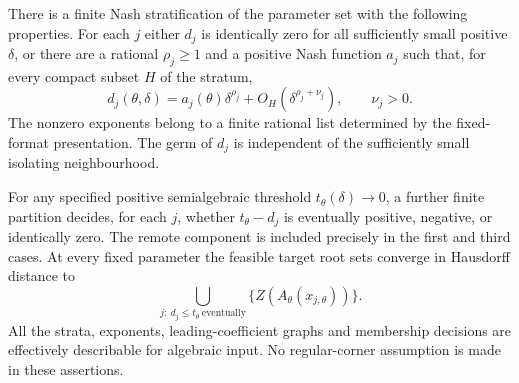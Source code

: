 \begin{theorem}\label{thm:singular-entrances}
There is a finite Nash stratification of the parameter set with the
following properties. For each $j$ either $d_j$ is identically zero for
all sufficiently small positive $\delta$, or there are a rational
$\rho_j\ge1$ and a positive Nash function $a_j$ such that, for every
compact subset $H$ of the stratum,
\begin{equation}\label{eq:singular-power}
 d_j(\theta,\delta)=a_j(\theta)\delta^{\rho_j}
            +O_H(\delta^{\rho_j+\nu_j}),\qquad \nu_j>0.
\end{equation}
The nonzero exponents belong to a finite rational list determined by the
fixed-format presentation. The germ of $d_j$ is independent of the
sufficiently small isolating neighbourhood.

For any specified positive semialgebraic threshold
$t_\theta(\delta)\to0$, a further finite partition decides, for each
$j$, whether $t_\theta-d_j$ is eventually positive, negative, or
identically zero. The remote component is included precisely in the first
and third cases. At every fixed parameter the feasible target root sets
converge in Hausdorff distance to
\begin{equation}\label{eq:entrance-union}
 \bigcup_{j:\ d_j\le t_\theta\ \mathrm{eventually}}
                         \{Z(A_\theta(x_{j,\theta}))\}.
\end{equation}
All the strata, exponents, leading-coefficient graphs and membership
decisions are effectively describable for algebraic input. No
regular-corner assumption is made in these assertions.
\end{theorem}
